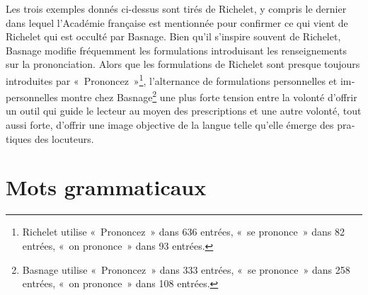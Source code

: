 \documentclass[output=paper,colorlinks,citecolor=brown,arabicfont,chinesefont,booklanguage=french]{langscibook}
\begin{document}
\begin{otherlanguage}{french}
Les trois exemples donnés ci-dessus sont tirés de Richelet, y compris le dernier dans lequel l'Académie française est mentionnée pour confirmer ce qui vient de Richelet qui est occulté par Basnage. Bien qu'il s'inspire souvent de Richelet, Basnage modifie fréquemment les formulations introduisant les renseignements sur la prononciation. Alors que les formulations de Richelet sont presque toujours introduites par «~Prononcez~»\footnote{Richelet utilise «~Prononcez~» dans 636 entrées, «~se prononce~» dans 82 entrées, «~on prononce~» dans 93 entrées.},  l’alternance de formulations personnelles et impersonnelles montre chez Basnage\footnote{Basnage utilise «~Prononcez~» dans 333 entrées, «~se prononce~» dans 258 entrées, «~on prononce~» dans 108 entrées.} une plus forte tension entre la volonté d'offrir un outil qui guide le lecteur au moyen des prescriptions et une autre volonté, tout aussi forte, d'offrir une image objective de la langue telle qu'elle émerge des pratiques des locuteurs. 

\section{Mots grammaticaux}


\end{otherlanguage}
\end{document}
